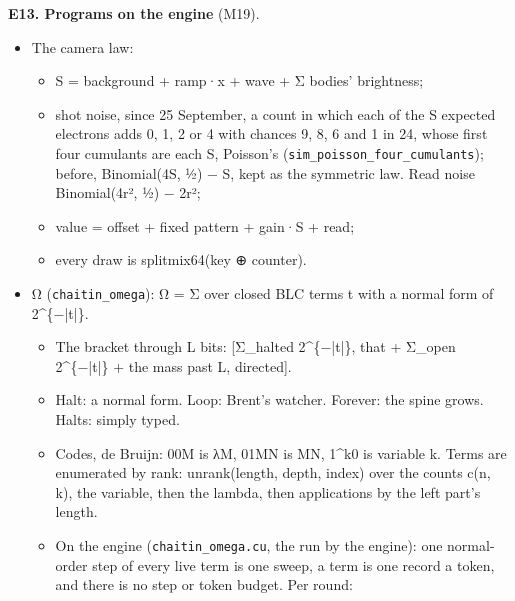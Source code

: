 \textbf{E13. Programs on the engine} (M19).

\begin{itemize}
\item The camera law:

\begin{itemize}
\item S = background + ramp·x + wave + Σ bodies' brightness;
\item shot noise, since 25 September, a count in which each of the S expected electrons adds 0, 1, 2 or 4 with chances 9, 8, 6 and 1 in 24, whose first four cumulants are each S, Poisson's (\texttt{sim\_\allowbreak{}poisson\_\allowbreak{}four\_\allowbreak{}cumulants}); before, Binomial(4S, ½) − S, kept as the symmetric law. Read noise Binomial(4r², ½) − 2r²;
\item value = offset + fixed pattern + gain·S + read;
\item every draw is splitmix64(key ⊕ counter).
\end{itemize}
\item Ω (\texttt{chaitin\_\allowbreak{}omega}): Ω = Σ over closed BLC terms t with a normal form of 2\textasciicircum{}\{−|t|\}.

\begin{itemize}
\item The bracket through L bits: [Σ\_\allowbreak{}halted 2\textasciicircum{}\{−|t|\}, that + Σ\_\allowbreak{}open 2\textasciicircum{}\{−|t|\} + the mass past L, directed].
\item Halt: a normal form. Loop: Brent's watcher. Forever: the spine grows. Halts: simply typed.
\item Codes, de Bruijn: 00M is λM, 01MN is MN, 1\textasciicircum{}k0 is variable k. Terms are enumerated by rank: unrank(length, depth, index) over the counts c(n, k), the variable, then the lambda, then applications by the left part's length.
\item On the engine (\texttt{chaitin\_\allowbreak{}omega.\allowbreak{}cu}, the run by the engine): one normal-order step of every live term is one sweep, a term is one record a token, and there is no step or token budget. Per round:


\end{itemize}
\end{itemize}
